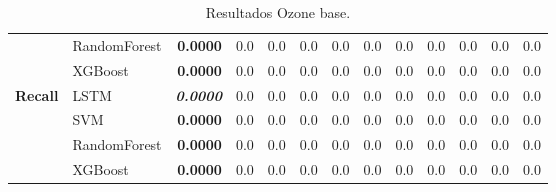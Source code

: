\begin{table}[H]
\begin{adjustbox}{max width=12cm}
\begin{tabular}{|c|l|r|r|r|r|r|r|r|r|r|r|r|}
			&  RandomForest & \textbf{  0.0000 } &  0.0 &  0.0 &  0.0 &  0.0 &  0.0 &  0.0 &  0.0 &  0.0 &  0.0 &  0.0 \\
			&  XGBoost & \textbf{  0.0000 } &  0.0 &  0.0 &  0.0 &  0.0 &  0.0 &  0.0 &  0.0 &  0.0 &  0.0 &  0.0 \\
			\hline
			\textbf{Recall} &  LSTM & \textit{ \textbf{  0.0000 } } &  0.0 &  0.0 &  0.0 &  0.0 &  0.0 &  0.0 &  0.0 &  0.0 &  0.0 &  0.0 \\
			&  SVM & \textbf{  0.0000 } &  0.0 &  0.0 &  0.0 &  0.0 &  0.0 &  0.0 &  0.0 &  0.0 &  0.0 &  0.0 \\
			&  RandomForest & \textbf{  0.0000 } &  0.0 &  0.0 &  0.0 &  0.0 &  0.0 &  0.0 &  0.0 &  0.0 &  0.0 &  0.0 \\
			&  XGBoost & \textbf{  0.0000 } &  0.0 &  0.0 &  0.0 &  0.0 &  0.0 &  0.0 &  0.0 &  0.0 &  0.0 &  0.0 \\
			\hline
		\end{tabular}
	\end{adjustbox}
	\caption{Resultados Ozone base.}
	\label{tab:Ozone_base}
\end{table}

